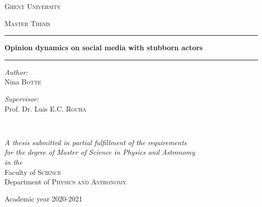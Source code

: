 \documentclass[11 pt , letterpaper , twoside , openright]{book}
\begin{document}
\frontmatter
{}

\begin{titlepage}
\begin{center}

\vspace*{.06\textheight}
{\scshape\LARGE \textcolor{NavyBlue}{Ghent University}\par}\vspace{1.5cm} %
\textsc{\Large Master Thesis}\\[0.5cm] %

\hrule %
\vspace{0.4cm} 
{\huge \bfseries Opinion dynamics on social media with stubborn actors\par}\vspace{0.4cm} %
\hrule %
\vspace{1.5cm} 
 
\begin{minipage}[t]{0.4\textwidth}
\begin{flushleft} \large
\emph{Author:}\\
\textcolor{NavyBlue}{Nina \textsc{Botte}} %
\end{flushleft}
\end{minipage}
\begin{minipage}[t]{0.4\textwidth}
\begin{flushright} \large
\emph{Supervisor:} \\
\textcolor{NavyBlue}{Prof. Dr. Luis E.C. \textsc{Rocha}} %
\end{flushright}
\end{minipage}\\[3cm]
 
\vfill

\large \textit{A thesis submitted in partial fulfillment of the requirements\\ for the degree of Master of Science in Physics and Astronomy}\\[0.3cm] %
\textit{in the}\\[0.4cm]
\textcolor{NavyBlue}{Faculty of \textsc{Science}}\\\textcolor{NavyBlue}{Department of \textsc{Physics and Astronomy}}\\[2cm] %
 
\vfill

{\large Academic year 2020-2021}\\[4cm] %
\vfill
\end{center}
\end{titlepage}
\end{document}
